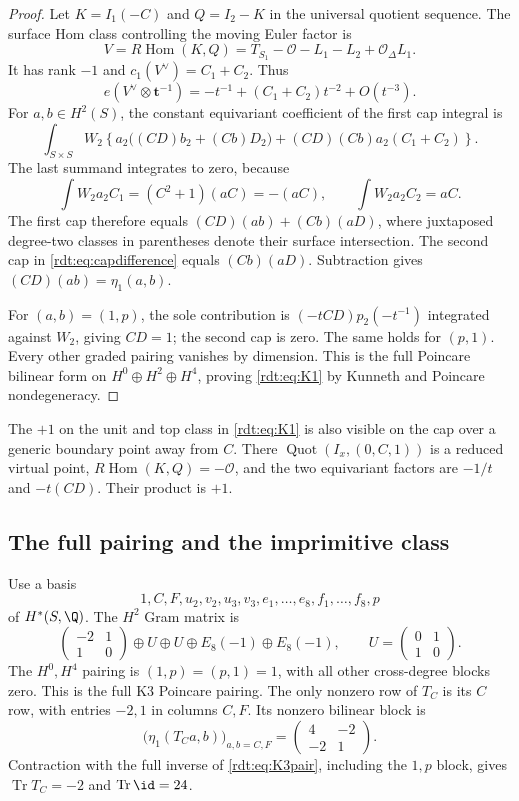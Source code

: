 \begin{proof}
Let $K=I_1(-C)$ and $Q=I_2-K$ in the universal quotient sequence.
The surface Hom class controlling the moving Euler factor is
\[
 V=R\operatorname{Hom}(K,Q)
     =T_{S_1}-\mathcal O-L_1-L_2+\mathcal O_\Delta L_1.
\]
It has rank $-1$ and $c_1(V^\vee)=C_1+C_2$. Thus
\begin{equation}\label{rdt:eq:eulerfactor}
 e(V^\vee\otimes\mathbf t^{-1})
   =-t^{-1}+(C_1+C_2)t^{-2}+O(t^{-3}).
\end{equation}
For $a,b\in H^2(S)$, the constant equivariant coefficient of the
first cap integral is
\[
 \int_{S\times S}W_2\left\{
  a_2\bigl((CD)b_2+(Cb)D_2\bigr)
    +(CD)(Cb)a_2(C_1+C_2)\right\}.
\]
The last summand integrates to zero, because
\[
 \int W_2a_2C_1=(C^2+1)(aC)=-(aC),\qquad
 \int W_2a_2C_2=aC.
\]
The first cap therefore equals $(CD)(ab)+(Cb)(aD)$, where
juxtaposed degree-two classes in parentheses denote their surface
intersection. The second cap in \eqref{rdt:eq:capdifference}
equals $(Cb)(aD)$. Subtraction gives $(CD)(ab)=\eta_1(a,b)$.

For $(a,b)=(1,p)$, the sole contribution is
$(-tCD)p_2(-t^{-1})$ integrated against $W_2$, giving $CD=1$;
the second cap is zero. The same holds for $(p,1)$. Every other
graded pairing vanishes by dimension. This is the full Poincare
bilinear form on $H^0\oplus H^2\oplus H^4$, proving
\eqref{rdt:eq:K1} by Kunneth and Poincare nondegeneracy.
\end{proof}

The $+1$ on the unit and top class in \eqref{rdt:eq:K1} is also
visible on the cap over a generic boundary point away from $C$.
There $\operatorname{Quot}(I_x,(0,C,1))$ is a reduced virtual point,
$R\operatorname{Hom}(K,Q)=-\mathcal O$, and the two equivariant
factors are $-1/t$ and $-t(CD)$. Their product is $+1$.

\subsection{The full pairing and the imprimitive class}

Use a basis
\[
 1,C,F,u_2,v_2,u_3,v_3,e_1,\ldots,e_8,f_1,\ldots,f_8,p
\]
of $H^*(S,\Q)$. The $H^2$ Gram matrix is
\begin{equation}\label{rdt:eq:K3pair}
 \begin{pmatrix}-2&1\\1&0\end{pmatrix}
 \oplus U\oplus U\oplus E_8(-1)\oplus E_8(-1),
 \qquad U=\begin{pmatrix}0&1\\1&0\end{pmatrix}.
\end{equation}
The $H^0,H^4$ pairing is $(1,p)=(p,1)=1$, with all other
cross-degree blocks zero. This is the full K3 Poincare pairing.
The only nonzero row of $T_C$ is its $C$ row, with entries $-2,1$
in columns $C,F$. Its nonzero bilinear block is
\[
 \bigl(\eta_1(T_Ca,b)\bigr)_{a,b=C,F}
  =\begin{pmatrix}4&-2\\-2&1\end{pmatrix}.
\]
Contraction with the full inverse of \eqref{rdt:eq:K3pair}, including
the $1,p$ block, gives $\operatorname{Tr} T_C=-2$ and $\operatorname{Tr}\id=24$.

